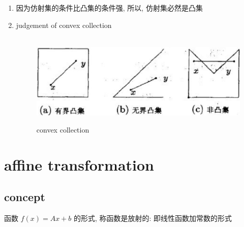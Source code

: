 \documentclass[oneside, 12pt]{ctexbook}
\begin{document}
\begin{enumerate}
					\item 因为仿射集的条件比凸集的条件强, 所以, 仿射集必然是凸集
					
					\item judgement of convex collection 	
						\begin{figure}[H]
							\vspace{-0.2cm}  %
							\setlength{\abovecaptionskip}{-0.2cm}   %
							\centering
							\includegraphics[scale=0.6]{convex_collection.png}
							\renewcommand{\figurename}{Fig} %
							\caption{convex collection}
							\label{fig:1}
						\end{figure}
				\end{enumerate}
			
		\section{\quad affine transformation}
			\subsection{\quad concept}
				函数 $f(x) = Ax + b$ 的形式, 称函数是放射的: 即线性函数加常数的形式
				
\end{document}
